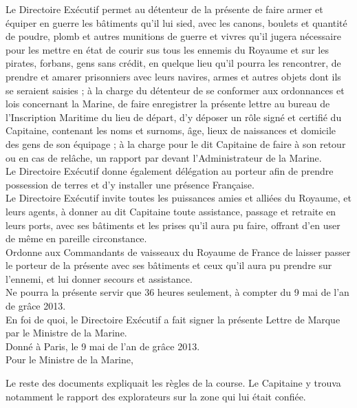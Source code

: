 {\selectfont Le Directoire Exécutif permet au détenteur de la présente de faire
armer et équiper en guerre les bâtiments qu'il lui sied, avec les
canons, boulets et quantité de poudre, plomb et autres munitions de
guerre et vivres qu'il jugera nécessaire pour les mettre en état de
courir sus tous les ennemis du Royaume et sur les pirates, forbans,
gens sans crédit, en quelque lieu qu'il pourra les rencontrer, de
prendre et amarer prisonniers avec leurs navires, armes et autres
objets dont ils se seraient saisies ; à la charge du détenteur de se
conformer aux ordonnances et lois concernant la Marine, de faire
enregistrer la présente lettre au bureau de l'Inscription Maritime du
lieu de départ, d'y déposer un rôle signé et certifié du Capitaine,
contenant les noms et surnoms, âge, lieux de naissances et domicile
des gens de son équipage ; à la charge pour le dit Capitaine de faire
à son retour ou en cas de relâche, un rapport par devant
l'Administrateur de la Marine.\\

Le Directoire Exécutif donne également délégation au porteur afin de
prendre possession de terres et d'y installer une présence
Française.\\

Le Directoire Exécutif invite toutes les puissances amies et alliées
du Royaume, et leurs agents, à donner au dit Capitaine toute
assistance, passage et retraite en leurs ports, avec ses bâtiments et
les prises qu'il aura pu faire, offrant d'en user de même en pareille
circonstance.\\

Ordonne aux Commandants de vaisseaux du Royaume de France de laisser
passer le porteur de la présente avec ses bâtiments et ceux qu'il aura
pu prendre sur l'ennemi, et lui donner secours et assistance.\\

Ne pourra la présente servir que 36 heures seulement, à compter du 9
mai de l'an de grâce 2013.\\

En foi de quoi, le Directoire Exécutif a fait signer la présente
Lettre de Marque par le Ministre de la Marine.\\

Donné à Paris, le 9 mai de l'an de grâce 2013.\\

Pour le Ministre de la Marine,}

Le reste des documents expliquait les règles de la course. Le
Capitaine y trouva notamment le rapport des explorateurs sur la zone
qui lui était confiée.

